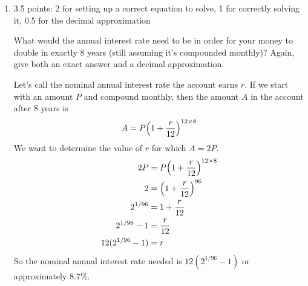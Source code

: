 \documentclass{article}
\begin{document}
\begin{enumerate}
\begin{enumerate}
    \begin{solution}
      If we start with an amount of money $P$, then the amount $A$
      in an account earning $3\%$ nominal annual interest, compounded
      monthly, after $t$ years is
      \begin{align*}
        A &= P\Bigl(1+\frac{0.03}{12}\Bigr)^{12t} \\
        &= P(1.0025)^{12t}
      \end{align*}
      We want to determine the value of $t$ for which $A=1.5P$.
      \begin{align*}
        1.5P &= P(1.0025)^{12t} \\
        1.5 &= (1.0025)^{12t} \\
        12 t &= \log_{1.0025} 1.5 \\
        t &= \frac{1}{12} \log_{1.0025} 1.5 \\
        &= \frac{\ln 1.5}{12\ln 1.0025}
      \end{align*}
      So it will take $\boxed{\frac{\ln 1.5}{12\ln 1.0025}}$ or
      approximately $\boxed{13.5}$ years for the amount of money
      in the account to increase by 50\%.
    \end{solution}

  \item

    \begin{grading}
      3.5 points: 2 for setting up a correct equation to solve, 1 for correctly solving it, 0.5 for the decimal approximation
    \end{grading}

    \begin{problem}[\vfill\newpage]
      What would the annual interest rate need to be in order for your money to double in exactly 8 years (still assuming it's compounded monthly)? Again, give both an exact answer and a decimal approximation. 
    \end{problem}

    \begin{solution}  
      Let's call the nominal annual interest rate the account earns $r$.
      If we start with an amount $P$ and compound monthly, then
      the amount $A$ in the account after $8$ years is
      \[A=P\Bigl(1+\frac{r}{12}\Bigr)^{12\times 8}\]
      We want to determine the value of $r$ for which $A=2P$.
      \begin{align*}
        2P &= P\Bigl(1+\frac{r}{12}\Bigr)^{12 \times 8} \\
        2 &= \Bigl(1+\frac{r}{12}\Bigr)^{96} \\
        2^{1/96} &= 1+\frac{r}{12} \\
        2^{1/96} - 1 &= \frac{r}{12} \\
        12(2^{1/96}-1) &= r
      \end{align*}
      So the nominal annual interest rate needed is
      $\boxed{12(2^{1/96}-1)}$ or approximately $8.7\%$.
    \end{solution}


\end{enumerate}
\end{enumerate}
\end{document}
